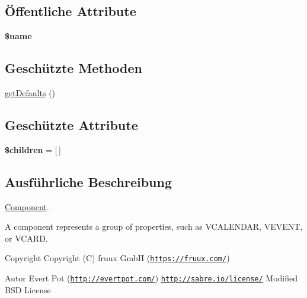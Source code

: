 \subsection*{Öffentliche Attribute}
\begin{DoxyCompactItemize}
\item 
\mbox{\label{class_sabre_1_1_v_object_1_1_component_a5fe51b3992ef71b0b1e63534ea56ed30}} 
{\bfseries \$name}
\end{DoxyCompactItemize}
\subsection*{Geschützte Methoden}
\begin{DoxyCompactItemize}
\item 
\mbox{\hyperlink{class_sabre_1_1_v_object_1_1_component_aea29b548a301df10fb87bd951dff4120}{get\+Defaults}} ()
\end{DoxyCompactItemize}
\subsection*{Geschützte Attribute}
\begin{DoxyCompactItemize}
\item 
\mbox{\label{class_sabre_1_1_v_object_1_1_component_adde66614e0e9055f611028b5262e5198}} 
{\bfseries \$children} = \mbox{[}$\,$\mbox{]}
\end{DoxyCompactItemize}


\subsection{Ausführliche Beschreibung}
\mbox{\hyperlink{class_sabre_1_1_v_object_1_1_component}{Component}}.

A component represents a group of properties, such as V\+C\+A\+L\+E\+N\+D\+AR, V\+E\+V\+E\+NT, or V\+C\+A\+RD.

\begin{DoxyCopyright}{Copyright}
Copyright (C) fruux GmbH (\href{https://fruux.com/}{\tt https\+://fruux.\+com/}) 
\end{DoxyCopyright}
\begin{DoxyAuthor}{Autor}
Evert Pot (\href{http://evertpot.com/}{\tt http\+://evertpot.\+com/})  \href{http://sabre.io/license/}{\tt http\+://sabre.\+io/license/} Modified B\+SD License 
\end{DoxyAuthor}


